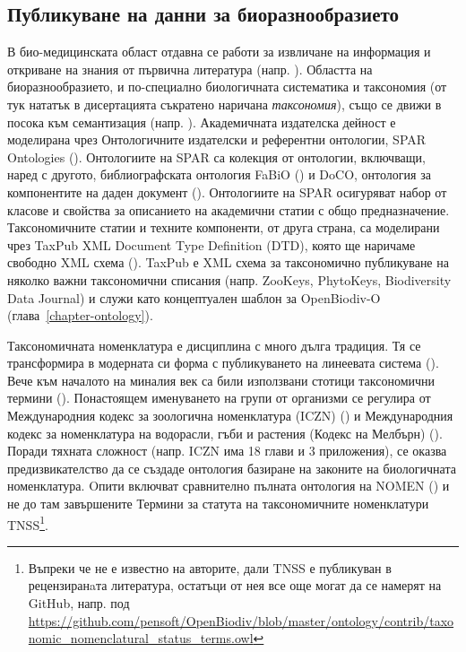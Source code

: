 \subsection*{Публикуване на данни за биоразнообразието}
В био-медицинската област отдавна се работи за извличане на информация и откриване на знания от първична литература (напр. \cite {rebholz-schuhmann_facts_2005, momtchev_expanding_2009, williams_open_2012}). Областта на биоразнообразието, и по-специално биологичната систематика и таксономия (от тук нататък в дисертацията съкратено наричана \emph{таксономия}), също се движи в посока към семантизация (напр. \cite{agosti_biodiversity_2006, patterson_taxonomic_2006, kennedy_scientific_2005, penev_fast_2010, tzitzikas_integrating_2013}). Академичната издателска дейност е моделирана чрез Онтологичните издателски и референтни онтологии, SPAR Ontologies (\cite {peroni_semantic_2014}). Онтологиите на SPAR са колекция от онтологии, включващи, наред с другото, библиографската онтология FaBiO (\cite{peroni_fabio_2012}) и DoCO, онтология за компонентите на даден документ (\cite{constantin_document_2016}). Онтологиите на SPAR осигуряват набор от класове и свойства за описанието на академични статии с общо предназначение. Таксономичните статии и техните компоненти, от друга страна, са моделирани чрез TaxPub XML Document Type Definition (DTD), която ще наричаме свободно XML схема (\cite{catapano_taxpub:_2010}). TaxPub е XML схема за таксономично публикуване на няколко важни таксономични списания (напр. ZooKeys, PhytoKeys, Biodiversity Data Journal) и служи като концептуален шаблон за OpenBiodiv-O (глава~\ref{chapter-ontology}).

Таксономичната номенклатура е дисциплина с много дълга традиция. Тя се трансформира в модерната си форма с публикуването на линеевата система (\cite {linnaeus_systema_1758}). Вече към началото на миналия век са били използвани стотици таксономични термини (\cite{witteveen_naming_2015}). Понастоящем именуването на групи от организми се регулира от Международния кодекс за зоологична номенклатура (ICZN) (\cite{international_commission_on_zoological_nomenclature_official_2017}) и Международния кодекс за номенклатура на водорасли, гъби и растения (Кодекс на Мелбърн) (\cite{noauthor_international_2012}). Поради тяхната сложност (напр. ICZN има 18 глави и 3 приложения), се оказва предизвикателство да се създаде онтология базиране на законите на биологичната номенклатура. Oпити включват сравнително пълната онтология на NOMEN (\cite{dmitriev_nomen_2017}) и не до там завършените Термини за статута на таксономичните номенклатури TNSS\footnote{Въпреки че не е известно на авторите, дали TNSS е публикуван в рецензиранaта литература, остатъци от нея все още могат да се намерят на GitHub, напр. под \url{https://github.com/pensoft/OpenBiodiv/blob/master/ontology/contrib/taxonomic_nomenclatural_status_terms.owl}}.

